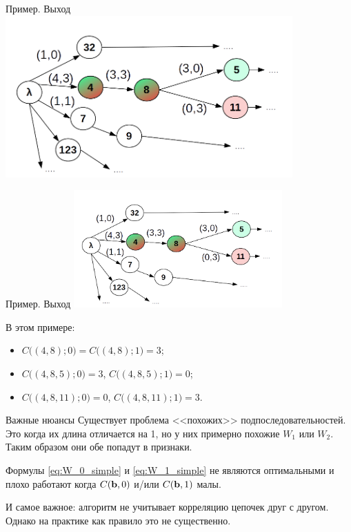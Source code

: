 \begin{frame}{Пример. Выход}
	\centering
	\includegraphics[width=11cm]{../pic/beh/D_example.png}
\end{frame}

\begin{frame}{Пример. Выход}
	\includegraphics[width=8cm]{../pic/beh/D_example.png}
	
	В этом примере:
	\begin{itemize}
		\item $C \big( (4,8); 0\big) =  C \big( (4,8); 1\big) = 3$;
		\item $C \big( (4,8,5); 0\big) = 3$, $C \big( (4,8,5); 1\big) = 0$;
		\item $C \big( (4,8,11); 0\big) = 0$, $C \big( (4,8,11); 1\big) = 3$.
	\end{itemize}
	
\end{frame}


\begin{frame}{Важные нюансы}
	Существует проблема <<похожих>> подпоследовательностей.
	Это когда их длина отличается на 1, но у них примерно похожие $W_1$ или $W_2$.
	Таким образом они обе попадут в признаки. 
	
	Формулы \eqref{eq:W_0_simple} и \eqref{eq:W_1_simple} не являются оптимальными 
	и плохо работают когда $C(\bold b, 0)$ и/или $C(\bold b, 1)$ малы.
	
	И самое важное: алгоритм не учитывает корреляцию цепочек друг с другом. 
	Однако на практике как правило это не существенно. 
\end{frame}

